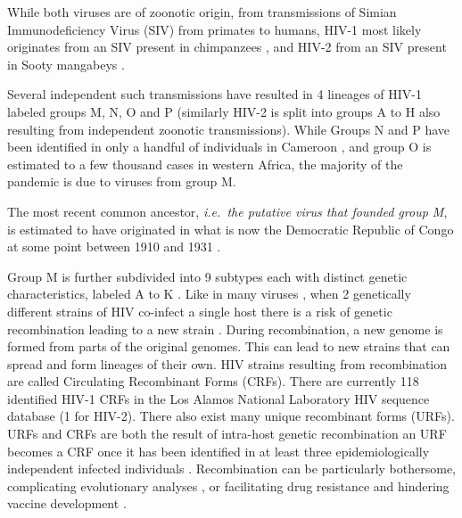 \documentclass[
  11pt,
  twoside,
  BCOR=10mm,
  listof=totoc]{scrbook}
\begin{document}
While both viruses are of zoonotic origin, from transmissions of Simian Immunodeficiency Virus (SIV) from primates to humans, HIV-1 most likely originates from an SIV present in chimpanzees \autocite{gaoOriginHIV1Chimpanzee1999,hamelTwentyYearsProspective2007,sharpOriginsHIVAIDS2011}, and HIV-2 from an SIV present in Sooty mangabeys \autocite{hirschAfricanPrimateLentivirus1989,gaoHumanInfectionGenetically1992,chenGeneticCharacterizationNew1996}.

Several independent such transmissions have resulted in 4 lineages of HIV-1 labeled groups M, N, O and P \autocite{hemelaarOriginDiversityHIV12012} (similarly HIV-2 is split into groups A to H also resulting from independent zoonotic transmissions). While Groups N and P have been identified in only a handful of individuals in Cameroon , and group O is estimated to a few thousand cases in western Africa, the majority of the pandemic is due to viruses from group M.

The most recent common ancestor, \emph{i.e.~the putative virus that founded group M}, is estimated to have originated in what is now the Democratic Republic of Congo \autocite{worobeyDirectEvidenceExtensive2008,vidalUnprecedentedDegreeHuman2000,fariaEarlySpreadEpidemic2014} at some point between 1910 and 1931 \autocite{korberTimingAncestorHIV12000,worobeyDirectEvidenceExtensive2008,rambautCausesConsequencesHIV2004}.

Group M is further subdivided into 9 subtypes each with distinct genetic characteristics, labeled A to K \autocite{mccutchanGlobalEpidemiologyHIV2006,sharpOriginsHIVAIDS2011}. Like in many viruses \autocite{perez-losadaRecombinationVirusesMechanisms2015}, when 2 genetically different strains of HIV co-infect a single host there is a risk of genetic recombination leading to a new strain \autocite{robertsonRecombinationAIDSViruses1995}. During recombination, a new genome is formed from parts of the original genomes. This can lead to new strains that can spread and form lineages of their own. HIV strains resulting from recombination are called Circulating Recombinant Forms (CRFs). There are currently 118 identified HIV-1 CRFs in the Los Alamos National Laboratory HIV sequence database \autocite{HIVCirculatingRecombinant} (1 for HIV-2). There also exist many unique recombinant forms (URFs). URFs and CRFs are both the result of intra-host genetic recombination an URF becomes a CRF once it has been identified in at least three epidemiologically independent infected individuals \autocite{lauCurrentTrendsHIV2013}. Recombination can be particularly bothersome, complicating evolutionary analyses \autocite{posadaRecombinationEvolutionaryGenomics2002}, or facilitating drug resistance and hindering vaccine development \autocite{taylorChallengeHIV1Subtype2008}.
\end{document}
